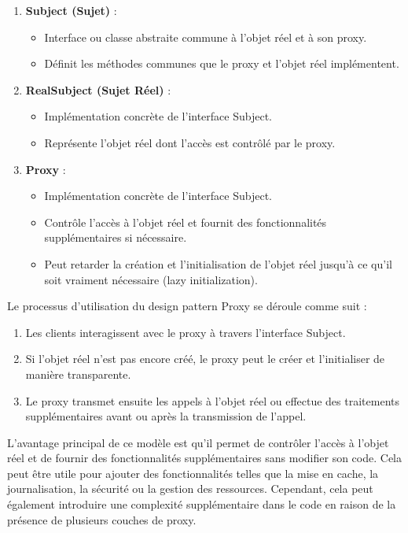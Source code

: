 \documentclass[french]{article}
\begin{document}
\begin{enumerate}
    \item \textbf{Subject (Sujet)} :
    \begin{itemize}
        \item Interface ou classe abstraite commune à l'objet réel et à son proxy.
        \item Définit les méthodes communes que le proxy et l'objet réel implémentent.
    \end{itemize}
    
    \item \textbf{RealSubject (Sujet Réel)} :
    \begin{itemize}
        \item Implémentation concrète de l'interface Subject.
        \item Représente l'objet réel dont l'accès est contrôlé par le proxy.
    \end{itemize}
    
    \item \textbf{Proxy} :
    \begin{itemize}
        \item Implémentation concrète de l'interface Subject.
        \item Contrôle l'accès à l'objet réel et fournit des fonctionnalités supplémentaires si nécessaire.
        \item Peut retarder la création et l'initialisation de l'objet réel jusqu'à ce qu'il soit vraiment nécessaire (lazy initialization).
    \end{itemize}
\end{enumerate}

Le processus d'utilisation du design pattern Proxy se déroule comme suit :

\begin{enumerate}
    \item Les clients interagissent avec le proxy à travers l'interface Subject.
    \item Si l'objet réel n'est pas encore créé, le proxy peut le créer et l'initialiser de manière transparente.
    \item Le proxy transmet ensuite les appels à l'objet réel ou effectue des traitements supplémentaires avant ou après la transmission de l'appel.
\end{enumerate}

L'avantage principal de ce modèle est qu'il permet de contrôler l'accès à l'objet réel et de fournir des fonctionnalités supplémentaires sans modifier son code. Cela peut être utile pour ajouter des fonctionnalités telles que la mise en cache, la journalisation, la sécurité ou la gestion des ressources. Cependant, cela peut également introduire une complexité supplémentaire dans le code en raison de la présence de plusieurs couches de proxy.
\end{document}
